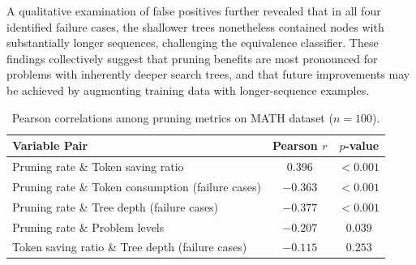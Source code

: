 \documentclass[11pt]{article}
\begin{document}
A qualitative examination of false positives further revealed that in all four identified failure cases, the shallower trees nonetheless contained nodes with substantially longer sequences, challenging the equivalence classifier. These findings collectively suggest that pruning benefits are most pronounced for problems with inherently deeper search trees, and that future improvements may be achieved by augmenting training data with longer-sequence examples.

\begin{table}[h]
\centering
\caption{Pearson correlations among pruning metrics on MATH dataset ($n=100$).}
\label{tab:correlation}
\begin{tabular}{lcc}
\hline
Variable Pair & Pearson $r$ & $p$-value \\
\hline
Pruning rate \& Token saving ratio & 0.396 & $<0.001$ \\
Pruning rate \& Token consumption (failure cases) & $-0.363$ & $<0.001$ \\
Pruning rate \& Tree depth (failure cases) & $-0.377$ & $<0.001$ \\
Pruning rate \& Problem levels & $-0.207$ & $0.039$ \\
Token saving ratio \& Tree depth (failure cases) & $-0.115$ & $0.253$ \\
\hline
\end{tabular}
\end{table}
\end{document}
